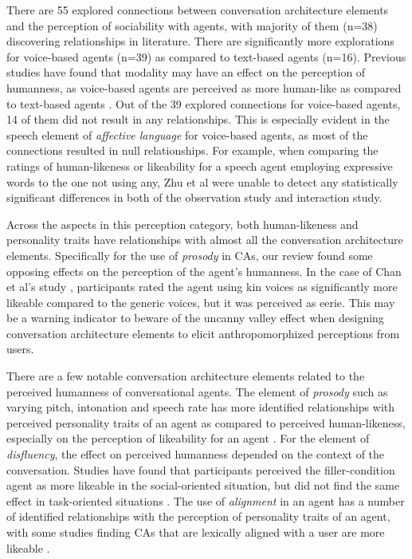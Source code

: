 There are 55 explored connections between conversation architecture elements and the perception of sociability with agents, with majority of them (n=38) discovering relationships in literature. There are significantly more explorations for voice-based agents (n=39) as compared to text-based agents (n=16). Previous studies have found that modality may have an effect on the perception of humanness, as voice-based agents are perceived as more human-like as compared to text-based agents \cite{cho2019effects}. Out of the 39 explored connections for voice-based agents, 14 of them did not result in any relationships. This is especially evident in the speech element of \textit{affective language} for voice-based agents, as most of the connections resulted in null relationships. For example, when comparing the ratings of human-likeness or likeability for a speech agent employing expressive words to the one not using any, Zhu et al \cite{zhu2022effects}\cmt{[26]} were unable to detect any statistically significant differences in both of the observation study and interaction study.

Across the aspects in this perception category, both human-likeness and personality traits have relationships with almost all the conversation architecture elements. Specifically for the use of \textit{prosody} in CAs, our review found some opposing effects on the perception of the agent's humanness. In the case of Chan et al's study \cite{chan2021kinvoices}\cmt{[74]}, participants rated the agent using kin voices as significantly more likeable compared to the generic voices, but it was perceived as eerie. This may be a warning indicator to beware of the uncanny valley effect \cite{mori2012uncanny} when designing conversation architecture elements to elicit anthropomorphized perceptions from users.

There are a few notable conversation architecture elements related to the perceived humanness of conversational agents. The element of \textit{prosody} such as varying pitch, intonation and speech rate has more identified relationships with perceived personality traits of an agent as compared to perceived human-likeness, especially on the perception of likeability for an agent \cite{choi2020nobody, jestin2022effects, misu2011toward}\cmt{[54][81][83]}. For the element of \textit{disfluency}, the effect on perceived humanness depended on the context of the conversation. Studies have found that participants perceived the filler-condition agent as more likeable in the social-oriented situation, but did not find the same effect in task-oriented situations \cite{jeong2019exploring, wester2015artificial}\cmt{[10][14]}. The use of \textit{alignment} in an agent has a number of identified relationships with the perception of personality traits of an agent, with some studies finding CAs that are lexically aligned with a user are more likeable \cite{huiyang2022improving, linnemann2018can}\cmt{[17][15]}. 
